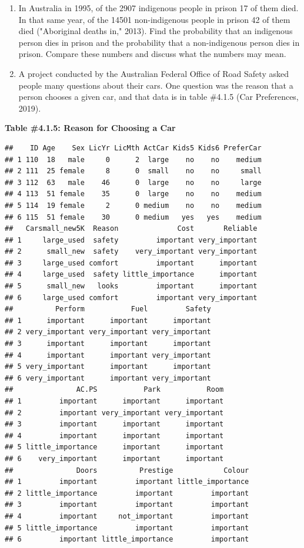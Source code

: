 \documentclass[
]{book}
\begin{document}
\begin{enumerate}
\def\labelenumi{\arabic{enumi}.}
\setcounter{enumi}{2}
\item
  In Australia in 1995, of the 2907 indigenous people in prison 17 of them died. In that same year, of the 14501 non-indigenous people in prison 42 of them died ("Aboriginal deaths in," 2013). Find the
  probability that an indigenous person dies in prison and the probability that a non-indigenous person dies in prison. Compare these numbers and discuss what the numbers may mean.
\item
  A project conducted by the Australian Federal Office of Road Safety asked people many questions about their cars. One question was the reason that a person chooses a given car, and that data is in table
  \#4.1.5 (Car Preferences, 2019).
\end{enumerate}

\textbf{Table \#4.1.5: Reason for Choosing a Car}

\begin{verbatim}
##    ID Age    Sex LicYr LicMth ActCar Kids5 Kids6 PreferCar
## 1 110  18   male     0      2  large    no    no    medium
## 2 111  25 female     8      0  small    no    no     small
## 3 112  63   male    46      0  large    no    no     large
## 4 113  51 female    35      0  large    no    no    medium
## 5 114  19 female     2      0 medium    no    no    medium
## 6 115  51 female    30      0 medium   yes   yes    medium
##   Carsmall_new5K  Reason              Cost       Reliable
## 1     large_used  safety         important very_important
## 2      small_new  safety    very_important very_important
## 3     large_used comfort         important      important
## 4     large_used  safety little_importance      important
## 5      small_new   looks         important      important
## 6     large_used comfort         important very_important
##          Perform           Fuel         Safety
## 1      important      important      important
## 2 very_important very_important very_important
## 3      important      important      important
## 4      important      important very_important
## 5 very_important      important      important
## 6 very_important      important very_important
##               AC.PS           Park           Room
## 1         important      important      important
## 2         important very_important very_important
## 3         important      important      important
## 4         important      important      important
## 5 little_importance      important      important
## 6    very_important      important      important
##               Doors          Prestige            Colour
## 1         important         important little_importance
## 2 little_importance         important         important
## 3         important         important         important
## 4         important     not_important         important
## 5 little_importance         important         important
## 6         important little_importance         important
\end{verbatim}
\end{document}
